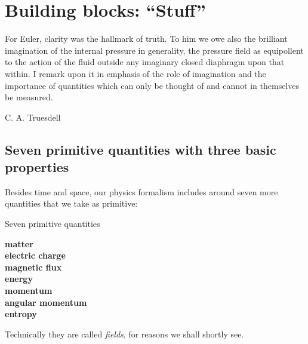 \documentclass[a4paper,12pt,%
onecolumn,oneside,titlepage,%
british%
]{memoir}
\renewcommand*{\|}[1][]{\nonscript\:#1\vert\nonscript\:\mathopen{}}
\begin{document}
% 
% 
% 
% 





\printpagenotes*
\clearpage
\chapter{Building blocks: \enquote{Stuff}}
\label{cha:stuff}

\epigraph{For Euler, clarity was the hallmark of truth. \textelp{} To him we owe also the brilliant imagination of the internal pressure in generality, the pressure field as equipollent to the action of the fluid outside any imaginary closed diaphragm upon that within. \textelp{} I remark upon it in emphasis of the role of imagination and the importance of quantities which can only be thought of and cannot in themselves be measured.}{C. A. Truesdell \cites*{truesdell1956d}}



\section[Seven primitive quantities]{Seven primitive quantities with three basic properties}
\label{sec:stuff}

Besides time and space, our physics formalism includes around seven more quantities that we take as primitive:
\begin{definition}{Seven primitive quantities}
  \begin{center}\bfseries
    matter
    \\ electric charge
    \\ magnetic flux
    \\ energy
    \\ momentum
    \\ angular momentum
    \\ entropy
  \end{center}
\end{definition}
Technically they are called \emph{fields}, for reasons we shall shortly see.
\end{document}
